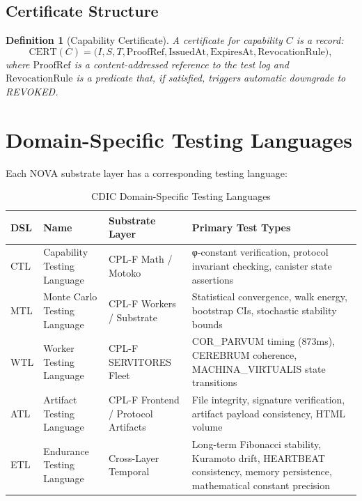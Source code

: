 \documentclass[11pt,a4paper]{article}
\newtheorem{definition}{Definition}
\begin{document}
\subsection{Certificate Structure}

\begin{definition}[Capability Certificate]
A \emph{certificate} for capability $C$ is a record:
\[
  \text{CERT}(C) = \bigl(I, S, T, \text{ProofRef}, \text{IssuedAt}, \text{ExpiresAt},
                          \text{RevocationRule}\bigr),
\]
where $\text{ProofRef}$ is a content-addressed reference to the test log and
$\text{RevocationRule}$ is a predicate that, if satisfied, triggers automatic
downgrade to REVOKED.
\end{definition}

\section{Domain-Specific Testing Languages}
\label{sec:dsls}

Each NOVA substrate layer has a corresponding testing language:

\begin{table}[h]
\centering
\caption{CDIC Domain-Specific Testing Languages}
\label{tab:dsls}
\begin{tabular}{lllp{5cm}}
\toprule
DSL & Name & Substrate Layer & Primary Test Types \\
\midrule
CTL & Capability Testing Language &
  CPL-F Math / Motoko &
  φ-constant verification, protocol invariant checking,
  canister state assertions \\
MTL & Monte Carlo Testing Language &
  CPL-F Workers / Substrate &
  Statistical convergence, walk energy, bootstrap CIs,
  stochastic stability bounds \\
WTL & Worker Testing Language &
  CPL-F SERVITORES Fleet &
  COR\_PARVUM timing (873ms), CEREBRUM coherence,
  MACHINA\_VIRTUALIS state transitions \\
ATL & Artifact Testing Language &
  CPL-F Frontend / Protocol Artifacts &
  File integrity, signature verification,
  artifact payload consistency, HTML volume \\
ETL & Endurance Testing Language &
  Cross-Layer Temporal &
  Long-term Fibonacci stability, Kuramoto drift,
  HEARTBEAT consistency, memory persistence,
  mathematical constant precision \\
\bottomrule
\end{tabular}
\end{table}
\end{document}
